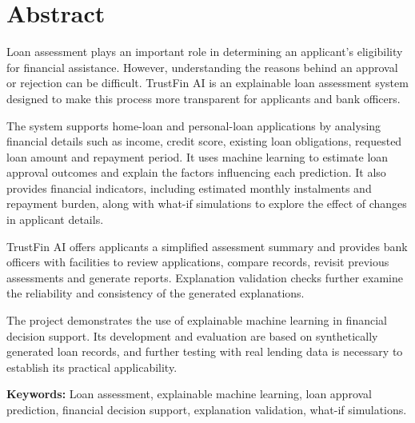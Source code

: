\chapter*{Abstract}

Loan assessment plays an important role in determining an applicant's eligibility for financial assistance. However, understanding the reasons behind an approval or rejection can be difficult. TrustFin AI is an explainable loan assessment system designed to make this process more transparent for applicants and bank officers.

The system supports home-loan and personal-loan applications by analysing financial details such as income, credit score, existing loan obligations, requested loan amount and repayment period. It uses machine learning to estimate loan approval outcomes and explain the factors influencing each prediction. It also provides financial indicators, including estimated monthly instalments and repayment burden, along with what-if simulations to explore the effect of changes in applicant details.

TrustFin AI offers applicants a simplified assessment summary and provides bank officers with facilities to review applications, compare records, revisit previous assessments and generate reports. Explanation validation checks further examine the reliability and consistency of the generated explanations.

The project demonstrates the use of explainable machine learning in financial decision support. Its development and evaluation are based on synthetically generated loan records, and further testing with real lending data is necessary to establish its practical applicability.


\noindent\textbf{Keywords:} Loan assessment, explainable machine learning, loan approval prediction, financial decision support, explanation validation, what-if simulations.
\clearpage
